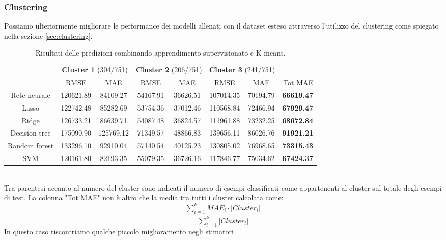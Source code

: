 \documentclass{article}
\begin{document}
\subsubsection{Clustering}
Possiamo ulteriormente migliorare le performance dei modelli allenati con il
dataset esteso attraverso l'utilizzo del clustering come spiegato nella sezione
\ref{sec:clustering}.
\begin{table}[ht]
	\small
	\centering
	\begin{tabular}{c|c|c|c|c|c|c|r|}
		\cline{2-8}
		& \multicolumn{2}{|c}{\textbf{Cluster 1} (304/751)}
		& \multicolumn{2}{|c|}{\textbf{Cluster 2} (206/751)}
		& \multicolumn{2}{c|}{\textbf{Cluster 3} (241/751)} & \\
		\cline{2-7}
		& RMSE & MAE & RMSE & MAE & RMSE & MAE & Tot MAE \\
		\hline
		\multicolumn{1}{|c|}{Rete neurale} & 120621.89 & 84109.27 & 54167.91 &
		36626.51 & 107014.35 & 70194.79 & \textbf{66619.47}\\
		\hline
		\multicolumn{1}{|c|}{Lasso}	& 122742.48 & 85282.69 & 53754.36 &
		37012.46 & 110568.84 & 72466.94 & \textbf{67929.47}\\
		\hline
		\multicolumn{1}{|c|}{Ridge} & 126733.21 & 86639.71 & 54087.48 &
		36824.57 & 111961.88 & 73232.25 & \textbf{68672.84}\\
		\hline
		\multicolumn{1}{|c|}{Decision tree} & 175090.90 & 125769.12 & 71349.57 &
		48866.83 & 139656.11 & 86026.76 & \textbf{91921.21}\\
		\hline
		\multicolumn{1}{|c|}{Random forest} & 133296.10 & 92910.04 & 57140.54 &
		40125.23 & 130805.02 & 76968.65 & \textbf{73315.43}\\
		\hline
		\multicolumn{1}{|c|}{SVM} & 120161.80 & 82193.35 & 55079.35 &
		36726.16 & 117846.77 & 75034.62 & \textbf{67424.37}\\
		\hline
	\end{tabular}
	\caption{Risultati delle predizioni combinando apprendimento supervisionato
	e K-means.}
\end{table}
\\
Tra parentesi accanto al numero del cluster sono indicati il numero di esempi
classificati come appartenenti al cluster sul totale degli esempi di test. 
La colonna "Tot MAE" non è altro che la media tra tutti i cluster calcolata
come:
\begin{equation}
	\frac{\sum_{i=1}^k MAE_i \cdot |Cluster_i|}{\sum_{i=1}^k |Cluster_i|}
\end{equation}
In questo caso riscontriamo qualche piccolo miglioramento negli stimatori
\end{document}
